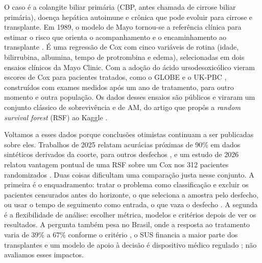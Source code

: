 \documentclass[12pt]{article}
\begin{document}
O caso é a colangite biliar primária (CBP, antes chamada de cirrose biliar primária), doença hepática autoimune e crônica que pode evoluir para cirrose e transplante. Em 1989, o modelo de Mayo tornou-se a referência clínica para estimar o risco que orienta o acompanhamento e o encaminhamento ao transplante \cite{dickson1989prognosis}. É uma regressão de Cox com cinco variáveis de rotina (idade, bilirrubina, albumina, tempo de protrombina e edema), selecionadas em dois ensaios clínicos da Mayo Clinic. Com a adoção do ácido ursodesoxicólico vieram escores de Cox para pacientes tratados, como o GLOBE \cite{lammers2015globe} e o UK-PBC \cite{carbone2016ukpbc}, construídos com exames medidos após um ano de tratamento, para outro momento e outra população. Os dados desses ensaios são públicos e viraram um conjunto clássico de sobrevivência e de AM, do artigo que propôs a \textit{random survival forest} (RSF) \cite{ishwaran2008rsf} ao Kaggle \cite{reade2023ps3e26}.

Voltamos a esses dados porque conclusões otimistas continuam a ser publicadas sobre eles. Trabalhos de 2025 relatam acurácias próximas de 90\% em dados sintéticos derivados da coorte, para outros desfechos \cite{shakir2025cirrhosis,tu2025cirrhosis}, e um estudo de 2026 relatou vantagem pontual de uma RSF sobre um Cox nos 312 pacientes randomizados \cite{graf2026coxrsf}. Duas coisas dificultam uma comparação justa nesse conjunto. A primeira é o enquadramento: tratar o problema como classificação e excluir os pacientes censurados antes do horizonte, o que seleciona a amostra pelo desfecho, ou usar o tempo de seguimento como entrada, o que vaza o desfecho \cite{kapoor2023leakage}. A segunda é a flexibilidade de análise: escolher métrica, modelos e critérios depois de ver os resultados. A pergunta também pesa no Brasil, onde a resposta ao tratamento varia de 39\% a 67\% conforme o critério \cite{cancado2022pbc}, o SUS financia a maior parte dos transplantes \cite{agenciagov2025transplantes} e um modelo de apoio à decisão é dispositivo médico regulado \cite{anvisa2022rdc657}; não avaliamos esses impactos.
\end{document}
